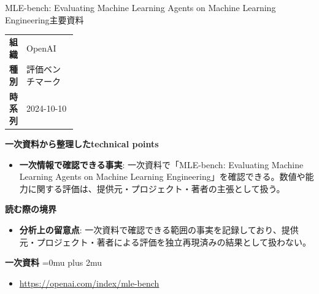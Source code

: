 \begin{technicalnote}{MLE-bench: Evaluating Machine Learning Agents on Machine Learning Engineering}{主要資料}
\begingroup
\begin{tabularx}{\linewidth}{@{}>{\bfseries}p{0.22\linewidth}X@{}}
組織 & OpenAI \\
種別 & 評価ベンチマーク \\
時系列 & 2024-10-10 \\
\end{tabularx}
\smallskip
{\bfseries 一次資料から整理したtechnical points}
\begin{itemize}[leftmargin=1.5em,itemsep=0.35em]
\item \textbf{一次情報で確認できる事実}: 一次資料で「MLE-bench: Evaluating Machine Learning Agents on Machine Learning Engineering」を確認できる。数値や能力に関する評価は、提供元・プロジェクト・著者の主張として扱う。
\end{itemize}
\begin{minipage}{\linewidth}
{\bfseries 読む際の境界}
\begin{itemize}[leftmargin=1.5em,itemsep=0.35em]
\item \textbf{分析上の留意点}: 一次資料で確認できる範囲の事実を記録しており、提供元・プロジェクト・著者による評価を独立再現済みの結果として扱わない。
\end{itemize}
\begin{samepage}
{\bfseries 一次資料}
\begingroup\sloppy
\Urlmuskip=0mu plus 2mu\relax
\begin{itemize}[leftmargin=1.5em,itemsep=0.25em]
\item {\scriptsize\url{https://openai.com/index/mle-bench}}
\end{itemize}
\endgroup
\end{samepage}
\end{minipage}
\endgroup
\end{technicalnote}
\medskip

